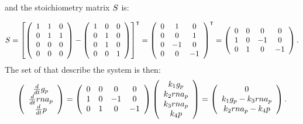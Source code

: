 and the stoichiometry matrix $S_{}$ is:

\begin{gather*}
    \stoichmatx{} = 
%
    \left[
        \left( \begin{array}{ccc}
                1 & 1 & 0 \\
                0 & 1 & 1 \\
                0 & 0 & 0 \\
                0 & 0 & 0
        \end{array} \right) -
        \left( \begin{array}{ccc}
                1 & 0 & 0 \\
                0 & 1 & 0 \\
                0 & 1 & 0 \\
                0 & 0 & 1   
        \end{array} \right)
    \right]^{\intercal} =
%
    \left( \begin{array}{ccc}
            0 & 1 & 0 \\
            0 & 0 & 1 \\
            0 & -1 & 0 \\
            0 & 0 & -1
    \end{array} \right)^{\intercal} =
%
    \left( \begin{array}{cccc}
         0 & 0 & 0 & 0 \\
         1 & 0 & -1 & 0 \\
         0 & 1 & 0 & -1
    \end{array} \right).
\end{gather*}
The set of  that describe the system is then:
\begin{gather*}\label{eq:simple_expression_ode}
    \left( \begin{array}{c}
        \ddt{}\con{g_p} \\
        \ddt{}\con{rna_p} \\
        \ddt{}\con{p}
    \end{array} \right) =
%
    \left( \begin{array}{cccc}
         0 & 0 & 0 & 0 \\
         1 & 0 & -1 & 0 \\
         0 & 1 & 0 & -1
    \end{array} \right)
    \left( \begin{array}{c}
        \condetx{1} \con{g_p} \\
        \condetx{2} \con{rna_p} \\
        \condetx{3} \con{rna_p} \\
        \condetx{4} \con{p}
    \end{array} \right) =
%
    \left( \begin{array}{c}
        0 \\
        \condetx{1} \con{g_p} - \condetx{3} \con{rna_p} \\
        \condetx{2} \con{rna_p} - \condetx{4} \con{p}
    \end{array} \right).
\end{gather*}
